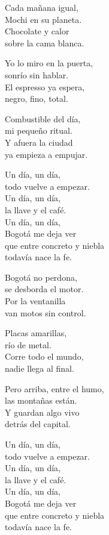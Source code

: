 \begin{lyrics}
Cada mañana igual,\\
Mochi en su planeta.\\
Chocolate y calor\\
sobre la cama blanca.

Yo lo miro en la puerta,\\
sonrío sin hablar.\\
El espresso ya espera,\\
negro, fino, total.

Combustible del día,\\
mi pequeño ritual.\\
Y afuera la ciudad\\
ya empieza a empujar.

Un día, un día,\\
todo vuelve a empezar.\\
Un día, un día,\\
la llave y el café.\\
Un día, un día,\\
Bogotá me deja ver\\
que entre concreto y niebla\\
todavía nace la fe.

Bogotá no perdona,\\
se desborda el motor.\\
Por la ventanilla\\
van motos sin control.

Placas amarillas,\\
río de metal.\\
Corre todo el mundo,\\
nadie llega al final.

Pero arriba, entre el humo,\\
las montañas están.\\
Y guardan algo vivo\\
detrás del capital.

Un día, un día,\\
todo vuelve a empezar.\\
Un día, un día,\\
la llave y el café.\\
Un día, un día,\\
Bogotá me deja ver\\
que entre concreto y niebla\\
todavía nace la fe.


\end{lyrics}
